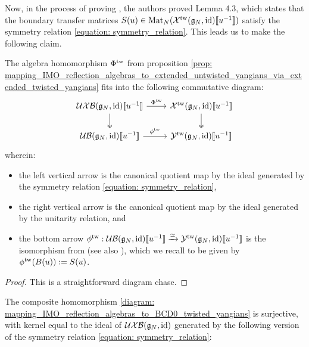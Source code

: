             Now, in the process of proving \cite[Theorem 4.1]{guay_regelskis_twisted_yangians_for_symmetric_pairs_of_types_BCD}, the authors proved Lemma 4.3, which states that the boundary transfer matrices $S(u) \in \mathrm{Mat}_N( \mathcal{X}^{\mathrm{tw}}(\mathfrak{g}_N, \mathrm{id})[\![u^{-1}]\!] )$ satisfy the symmetry relation \eqref{equation: symmetry_relation}. This leads us to make the following claim.
            \begin{theorem} \label{theorem: IMO_reflection_algebras_vs_BCD0_twisted_yangians}
                The algebra homomorphism $\Phi^{\mathrm{tw}}$ from proposition \ref{prop: mapping_IMO_reflection_algebras_to_extended_untwisted_yangians_via_extended_twisted_yangians} fits into the following commutative diagram:
                    $$
                        \begin{tikzcd}
                    	{\UXB(\g_N, \id)[\![u^{-1}]\!]} & {\calX^{\tw}(\g_N, \id)[\![u^{-1}]\!]} \\
                    	{\UB(\g_N, \id)[\![u^{-1}]\!]} & {\calY^{\tw}(\g_N, \id)[\![u^{-1}]\!]}
                    	\arrow["{{\Phi^{\tw}}}", from=1-1, to=1-2]
                    	\arrow[two heads, from=1-1, to=2-1]
                    	\arrow[two heads, from=1-2, to=2-2]
                    	\arrow["\phi^{\tw}", from=2-1, to=2-2]
                        \end{tikzcd}
                    $$
                wherein:
                \begin{itemize}
                    \item the left vertical arrow is the canonical quotient map by the ideal generated by the symmetry relation \eqref{equation: symmetry_relation},
                    \item the right vertical arrow is the canonical quotient map by the ideal generated by the unitarity relation, and
                    \item the bottom arrow $\phi^{\mathrm{tw}}: \mathcal{UB}(\mathfrak{g}_N, \mathrm{id})[\![u^{-1}]\!] \xrightarrow[]{\simeq} \mathcal{Y}^{\mathrm{tw}}(\mathfrak{g}_N, \mathrm{id})[\![u^{-1}]\!]$ is the isomorphism from \cite[Theorem 4.1]{guay_regelskis_twisted_yangians_for_symmetric_pairs_of_types_BCD} (see also \cite[Equation 4.32]{guay_regelskis_twisted_yangians_for_symmetric_pairs_of_types_BCD}), which we recall to be given by $\phi^{\mathrm{tw}}( B(u) ) := S(u)$. 
                \end{itemize}
            \end{theorem}
                \begin{proof}
                    This is a straightforward diagram chase.
                \end{proof}
            \begin{corollary} \label{coro: IMO_reflection_algebras_vs_BCD0_twisted_yangians}
                The composite homomorphism \eqref{diagram: mapping_IMO_reflection_algebras_to_BCD0_twisted_yangians} is surjective, with kernel equal to the ideal of $\mathcal{UXB}(\mathfrak{g}_N, \mathrm{id})$ generated by the following version of the symmetry relation \eqref{equation: symmetry_relation}:
            \end{corollary}
    
    \printbibliography

